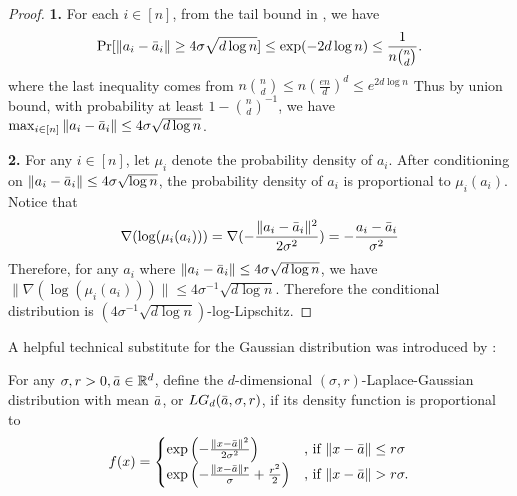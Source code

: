 \documentclass{theoretics}
\newcommand{\R}{\mathbb R}
\begin{document}
\begin{proof}
    \textbf{1.} For each $i \in [n]$, from the tail bound in , we have 
    \begin{align*}
        \Pr[\|a_i - \Bar{a}_i\| \geq 4\sigma \sqrt{d \log n}] \leq \exp(-2d \log n ) \leq \frac{1}{n \binom{n}{d}}.
    \end{align*}
    where the last inequality comes from $n\binom{n}{d} \leq n(\frac{en}{d})^d \leq e^{2d\log n}$
    Thus by union bound, with probability at least $1 - \binom{n}{d}^{-1}$, we have $\max_{i \in [n]} \|a_i - \Bar{a}_i\| \leq 4\sigma \sqrt{d \log n}$.
    
    \textbf{2.} For any $i\in [n]$, let $\mu_i$ denote the probability density of $a_i$. After conditioning on $\|a_i - \Bar{a}_i\| \leq 4\sigma \sqrt{\log n}$, the probability density of $a_i$ is proportional to $\mu_i(a_i)$. Notice that 
    \begin{align*}
        \nabla (\log (\mu_i(a_i))) = \nabla (-\frac{\|a_i - \Bar{a}_i\|^2}{2\sigma^2}) = - \frac{a_i - \Bar{a}_i}{\sigma^2}
    \end{align*}
    Therefore, for any $a_i$ where $\|a_i - \Bar{a}_i\| \leq 4\sigma \sqrt{d \log n}$, we have $\|\nabla (\log (\mu_i(a_i)))\| \leq 4\sigma^{-1} \sqrt{d \log n}$. Therefore the conditional distribution is $(4\sigma^{-1} \sqrt{d\log n})$-log-Lipschitz.
\end{proof}
\fi



A helpful technical substitute for the Gaussian distribution was introduced by \cite{DH18}:
\begin{definition}\label{def:laplace-gaussian-distribution}
    For any $\sigma, r > 0, \Bar{a} \in \R^d$, define the $d$-dimensional $(\sigma, r)$-Laplace-Gaussian distribution with mean $\Bar{a}$, or $LG_d(\Bar{a}, \sigma, r)$, if its density function is proportional to
    \begin{align}
        f(x) = \begin{cases}
        \exp\left( -\frac{\|x - \Bar{a}\|^2 }{2\sigma^2} \right) & \text{, if } \|x - \Bar{a}\| \leq r\sigma \\
        \exp\left( -\frac{\|x - \Bar{a}\| r }{\sigma} + \frac{r^2}{2} \right) & \text{, if } \|x - \Bar{a}\| > r\sigma.
        \end{cases} \label{eq:laplace-gaussian}
    \end{align}
\end{definition}
\end{document}
